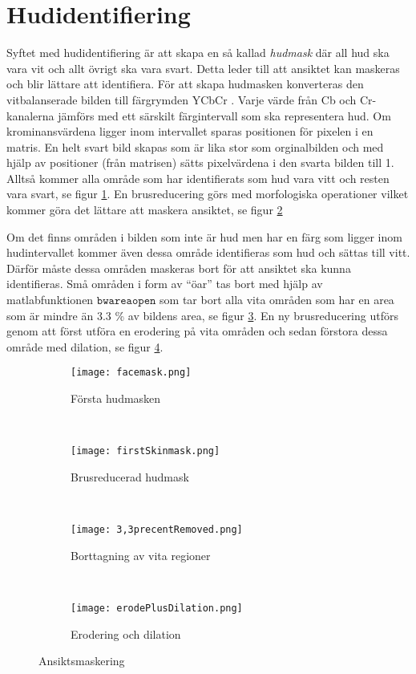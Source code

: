 \documentclass[a4paper,12pt,oneside,final]{extbook}
\begin{document}
\section{Hudidentifiering}
Syftet med hudidentifiering är att skapa en så kallad \textit{hudmask} där all hud ska vara vit och allt övrigt ska vara svart. Detta leder till att ansiktet kan maskeras och blir lättare att identifiera. För att skapa hudmasken konverteras den vitbalanserade bilden till färgrymden YCbCr \cite{FDiCI}. Varje värde från Cb och Cr-kanalerna jämförs med ett särskilt färgintervall som ska representera hud. Om krominansvärdena ligger inom intervallet sparas positionen för pixelen i en matris. En helt svart bild skapas som är lika stor som orginalbilden och med hjälp av positioner (från matrisen) sätts pixelvärdena i den svarta bilden till 1. Alltså kommer alla område som har identifierats som hud vara vitt och resten vara svart, se figur \ref{fig:firstSkinmask}. En brusreducering görs med morfologiska operationer vilket kommer göra det lättare att maskera ansiktet, se figur \ref{fig:reducedMask}   

Om det finns områden i bilden som inte är hud men har en färg som ligger inom hudintervallet kommer även dessa område identifieras som hud och sättas till vitt. Därför måste dessa områden maskeras bort för att ansiktet ska kunna identifieras. Små områden i form av “öar” tas bort med hjälp av matlabfunktionen $\mathtt{bwareaopen}$ som tar bort alla vita områden som har en area som är mindre än 3.3 \% av bildens area, se figur \ref{fig:3,3precentRemoved}. En ny brusreducering utförs genom att först utföra en erodering på vita områden och sedan förstora dessa område med dilation, se figur \ref{fig:erodePlusDilation}.


\begin{figure}[h]
    \centering
    \begin{subfigure}[b]{0.22\textwidth}
        \texttt{[image: facemask.png]}
        \caption{Första hudmasken \break}
        \label{fig:firstSkinmask}
    \end{subfigure}
    ~ 
    \begin{subfigure}[b]{0.22\textwidth}
        \texttt{[image: firstSkinmask.png]}
        \caption{Brusreducerad hudmask}
        \label{fig:reducedMask}
    \end{subfigure}
    ~ 
    \begin{subfigure}[b]{0.22\textwidth}
        \texttt{[image: 3,3precentRemoved.png]}
        \caption{Borttagning av vita regioner}
        \label{fig:3,3precentRemoved}
    \end{subfigure}
    ~ 
    \begin{subfigure}[b]{0.22\textwidth}
        \texttt{[image: erodePlusDilation.png]}
        \caption{Erodering och dilation}
        \label{fig:erodePlusDilation}
    \end{subfigure}
    \caption{Ansiktsmaskering}\label{fig:binaryImages}
\end{figure}
 
\end{document}

